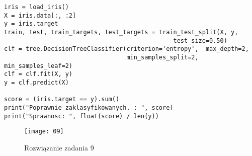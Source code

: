 \documentclass[12pt,a4paper]{article}
\begin{document}
\begin{itemize}
\begin{lstlisting}
iris = load_iris()
X = iris.data[:, :2]
y = iris.target 
train, test, train_targets, test_targets = train_test_split(X, y,
                                               test_size=0.50)
clf = tree.DecisionTreeClassifier(criterion='entropy',  max_depth=2,
                                  min_samples_split=2, min_samples_leaf=2)
clf = clf.fit(X, y)
y = clf.predict(X)

score = (iris.target == y).sum()
print("Poprawnie zaklasyfikowanych. : ", score)
print("Sprawnosc: ", float(score) / len(y))
	\end{lstlisting}
		\begin{figure}[h]
                        \texttt{[image: 09]}
                        \centering
			\caption{Rozwiązanie zadania 9}
			\label{fig:fig9}
                \end{figure}
                \clearpage
        \end{itemize}
	
\end{document}
